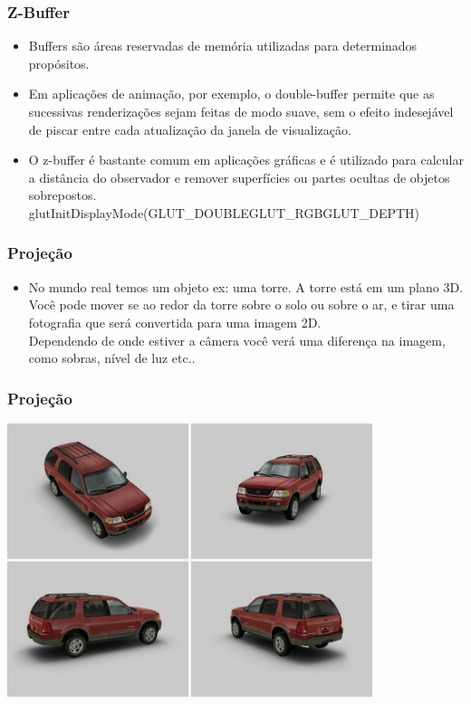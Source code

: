 \documentclass{beamer}
\begin{document}
	\begin{frame}
		\frametitle{Z-Buffer}
		\begin{itemize}
		\item Buffers são áreas reservadas de memória utilizadas para determinados propósitos. 
		\item Em aplicações de animação, por exemplo, o double-buffer permite que as sucessivas renderizações sejam feitas de modo suave, sem o efeito indesejável de piscar entre cada atualização da janela de visualização. 
	 	\item O z-buffer é bastante comum em aplicações gráficas e é utilizado para calcular a distância do observador e remover superfícies ou partes ocultas de objetos sobrepostos.\\
		glutInitDisplayMode(GLUT\_DOUBLE\textbar GLUT\_RGB\textbar GLUT\_DEPTH)
		\end{itemize}
	\end{frame}
	\begin{frame}
		\frametitle{Projeção}
		\begin{itemize}
		\item No mundo real temos um objeto ex: uma torre. A torre está em um plano 3D. Você pode mover se ao redor da torre sobre o solo ou sobre o ar, e tirar uma fotografia que será convertida para uma imagem 2D.\\
		Dependendo de onde estiver a câmera você verá uma diferença na imagem, como sobras, nível de luz etc..
		\end{itemize}
	\end{frame}
	\begin{frame}
		\frametitle{Projeção}
		\begin{center}
			\includegraphics[height=8cm]{carros.png}
		\end{center}
	\end{frame}
\end{document}
